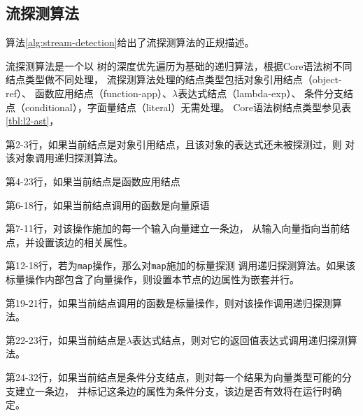 
\subsection{流探测算法}\label{subsec:stream-detection-algorithm}
算法\ref{alg:stream-detection}给出了流探测算法的正规描述。

流探测算法是一个以
树的深度优先遍历为基础的递归算法，根据Core语法树不同结点类型做不同处理，
流探测算法处理的结点类型包括对象引用结点（object-ref）、
函数应用结点（function-app）、$\lambda$表达式结点（lambda-exp）、
条件分支结点（conditional），字面量结点（literal）无需处理。
Core语法树结点类型参见表\ref{tbl:l2-ast}，
\begin{compactitem}
  \item 第2-3行，如果当前结点是对象引用结点，且该对象的表达式还未被探测过，则
    对该对象调用递归探测算法。
  \item 第4-23行，如果当前结点是函数应用结点
    \begin{compactitem}
      \item 第6-18行，如果当前结点调用的函数是向量原语
        \begin{compactitem}
          \item 第7-11行，对该操作施加的每一个输入向量建立一条边，
            从输入向量指向当前结点，并设置该边的相关属性。
          \item 第12-18行，若为\texttt{map}操作，那么对\texttt{map}施加的标量探测
            调用递归探测算法。如果该标量操作内部包含了向量操作，则设置本节点的边属性为嵌套并行。
        \end{compactitem}
      \item 第19-21行，如果当前结点调用的函数是标量操作，则对该操作调用递归探测算法。
    \end{compactitem}
  \item 第22-23行，如果当前结点是$\lambda$表达式结点，则对它的返回值表达式调用递归探测算法。
  \item 第24-32行，如果当前结点是条件分支结点，则对每一个结果为向量类型可能的分支建立一条边，
    并标记这条边的属性为条件分支，该边是否有效将在运行时确定。
\end{compactitem}
